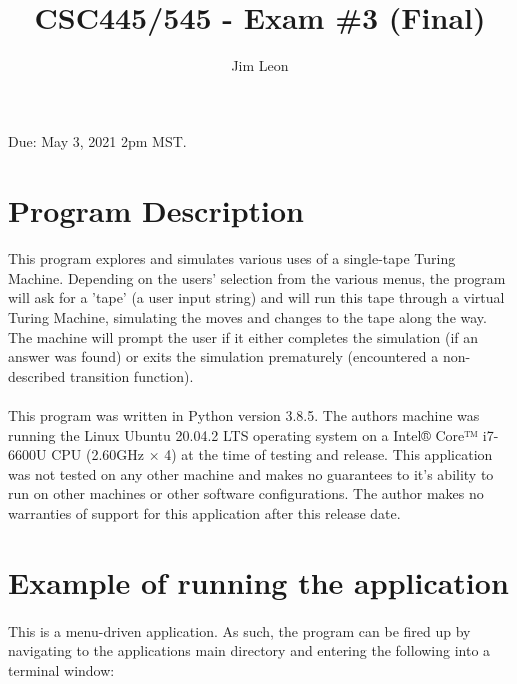 \documentclass[12pt]{article}
\title{CSC445/545 - Exam \#3 (Final)}
\author{Jim Leon}
\begin{document}
\maketitle
Due:  May 3, 2021 2pm MST.


\section{Program Description}
\paragraph{}
This program explores and simulates various uses of a single-tape Turing 
Machine.  Depending on the users' selection from the various menus, the 
program will ask for a 'tape' (a user input string) and will run this tape 
through a virtual Turing Machine, simulating the moves and changes to the 
tape along the way.  The machine will prompt the user if it either completes 
the simulation (if an answer was found) or exits the simulation prematurely
(encountered a non-described transition function).

\paragraph{}
This program was written in Python version 3.8.5.  The authors machine was 
running the Linux Ubuntu 20.04.2 LTS operating system on a Intel® Core™ 
i7-6600U CPU (2.60GHz × 4) at the time of testing and release.  This 
application was not tested on any other machine and makes no guarantees to 
it's ability to run on other machines or other software configurations.  The 
author makes no warranties of support for this application after this release 
date.

\section{Example of running the application}
\paragraph{}
This is a menu-driven application.  As such, the program can be fired up by 
navigating to the applications main directory and entering the following into 
a terminal window:
\end{document}
